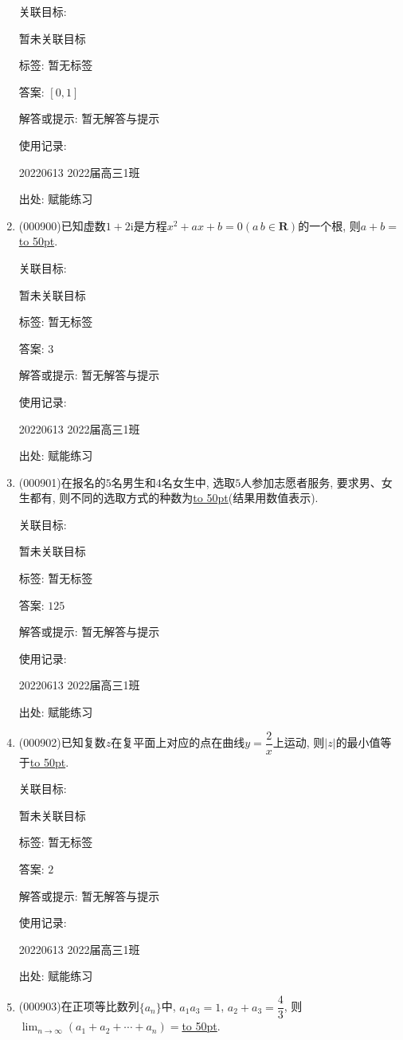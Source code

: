 \documentclass[10pt,a4paper]{article}
\newcommand{\blank}[1]{\underline{\hbox to #1pt{}}}
\begin{document}
\begin{enumerate}[1.]
关联目标:

暂未关联目标



标签: 暂无标签

答案: $[0,1]$

解答或提示: 暂无解答与提示

使用记录:

20220613	2022届高三1班	


出处: 赋能练习
\item { (000900)}已知虚数$1+2\mathrm{i}$是方程$x^2+ax+b=0 (a\,b\in \mathbf{R})$的一个根, 则$a+b=$\blank{50}.


关联目标:

暂未关联目标



标签: 暂无标签

答案: $3$

解答或提示: 暂无解答与提示

使用记录:

20220613	2022届高三1班	


出处: 赋能练习
\item { (000901)}在报名的$5$名男生和$4$名女生中, 选取$5$人参加志愿者服务, 要求男、女生都有, 则不同的选取方式的种数为\blank{50}(结果用数值表示).


关联目标:

暂未关联目标



标签: 暂无标签

答案: $125$

解答或提示: 暂无解答与提示

使用记录:

20220613	2022届高三1班	


出处: 赋能练习
\item { (000902)}已知复数$z$在复平面上对应的点在曲线$y=\dfrac 2 x$上运动, 则$|z|$的最小值等于\blank{50}.


关联目标:

暂未关联目标



标签: 暂无标签

答案: $2$

解答或提示: 暂无解答与提示

使用记录:

20220613	2022届高三1班	


出处: 赋能练习
\item { (000903)}在正项等比数列$\{a_n\}$中, $a_1a_3=1$, $a_2+a_3=\dfrac43$, 则$\displaystyle\lim_{n\to\infty}(a_1+a_2+\cdots +a_n)=$\blank{50}.



\end{enumerate}
\end{document}

